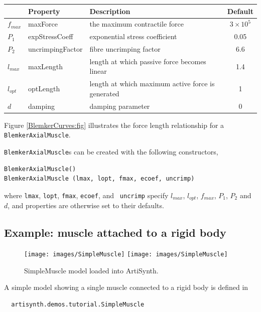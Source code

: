 \begin{center}
\begin{tabular}{|l|l|l|c|} 
\hline
 & Property & Description & Default\\
\hline
$f_{max}$ & {\sf maxForce} & the maximum contractile force & $3 \times 10^5$ \\
$P_1$ & {\sf expStressCoeff} & exponential stress coefficient & 0.05 \\
$P_2$ & {\sf uncrimpingFactor} & fibre uncrimping factor & 6.6 \\
$l_{max}$ & {\sf maxLength} & 
length at which passive force becomes linear & 1.4 \\
$l_{opt}$ & {\sf optLength} & 
length at which maximum active force is generated & 1 \\
$d$ & {\sf damping} & damping parameter & 0 \\ 
\hline
\end{tabular}
\end{center}

Figure \ref{BlemkerCurves:fig} illustrates the force length relationship
for a {\tt BlemkerAxialMuscle}. 

{\tt BlemkerAxialMuscle}s can be created with the following 
constructors, 
\begin{lstlisting}[]
BlemkerAxialMuscle()
BlemkerAxialMuscle (lmax, lopt, fmax, ecoef, uncrimp)
\end{lstlisting}
%
where {\tt lmax}, {\tt lopt}, {\tt fmax}, {\tt ecoef}, and {\tt
uncrimp} specify $l_{max}$, $l_{opt}$, $f_{max}$, $P_1$, $P_2$ and
$d$, and properties are otherwise set to their defaults.

\subsection{Example: muscle attached to a rigid body}
\label{SimpleMuscleExample:sec}

\begin{figure}[ht]
\begin{center}
\iflatexml
 \texttt{[image: images/SimpleMuscle]}
\else
 \texttt{[image: images/SimpleMuscle]}
\fi
\end{center}
\caption{SimpleMuscle model loaded into ArtiSynth.}
\label{SimpleMuscle:fig}
\end{figure}

A simple model showing a single muscle connected to a rigid
body is defined in
%
\begin{verbatim}
  artisynth.demos.tutorial.SimpleMuscle
\end{verbatim}
%

